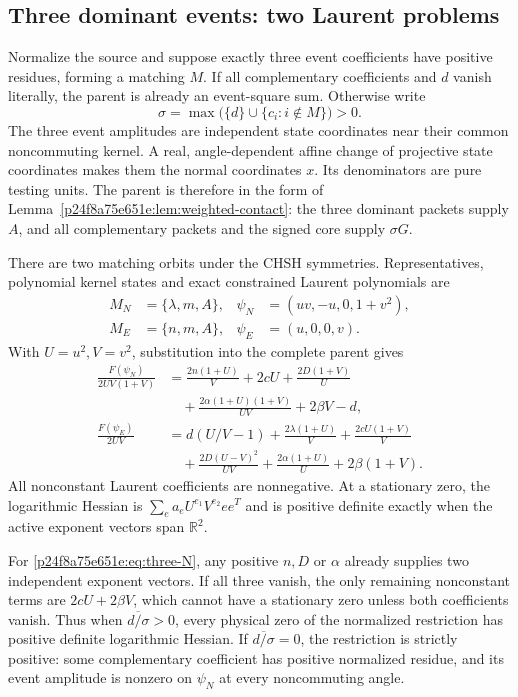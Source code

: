 \subsection{Three dominant events: two Laurent problems}
Normalize the source and suppose exactly three event coefficients have positive residues, forming a matching $M$. If all complementary coefficients and $d$ vanish literally, the parent is already an event-square sum. Otherwise write
\[
\sigma=\max\bigl(\{d\}\cup\{c_i:i\notin M\}\bigr)>0.
\]
The three event amplitudes are independent state coordinates near their common noncommuting kernel. A real, angle-dependent affine change of projective state coordinates makes them the normal coordinates $x$. Its denominators are pure testing units. The parent is therefore in the form of Lemma~\ref{p24f8a75e651e:lem:weighted-contact}: the three dominant packets supply $A$, and all complementary packets and the signed core supply $\sigma G$.

There are two matching orbits under the CHSH symmetries. Representatives, polynomial kernel states and exact constrained Laurent polynomials are
\begin{align*}
M_N&=\{\lambda,m,A\}, &\psi_N&=(uv,-u,0,1+v^2),\\
M_E&=\{n,m,A\}, &\psi_E&=(u,0,0,v).
\end{align*}
With $U=u^2,V=v^2$, substitution into the complete parent gives
\begin{align}
\frac{F(\psi_N)}{2UV(1+V)}
&=\frac{2n(1+U)}V+2cU+\frac{2D(1+V)}U\nonumber\\
&\quad +\frac{2\alpha(1+U)(1+V)}{UV}+2\beta V-d,
\label{p24f8a75e651e:eq:three-N}\\
\frac{F(\psi_E)}{2UV}
&=d(U/V-1)+\frac{2\lambda(1+U)}V+\frac{2cU(1+V)}V\nonumber\\
&\quad +\frac{2D(U-V)^2}{UV}+\frac{2\alpha(1+U)}U+2\beta(1+V).
\label{p24f8a75e651e:eq:three-E}
\end{align}
All nonconstant Laurent coefficients are nonnegative. At a stationary zero, the logarithmic Hessian is
$\sum_e a_e U^{e_1}V^{e_2}ee^T$ and is positive definite exactly when the active exponent vectors span $\mathbb R^2$.

For \eqref{p24f8a75e651e:eq:three-N}, any positive $n,D$ or $\alpha$ already supplies two independent exponent vectors. If all three vanish, the only remaining nonconstant terms are $2cU+2\beta V$, which cannot have a stationary zero unless both coefficients vanish. Thus when $\overline{d/\sigma}>0$, every physical zero of the normalized restriction has positive definite logarithmic Hessian. If $\overline{d/\sigma}=0$, the restriction is strictly positive: some complementary coefficient has positive normalized residue, and its event amplitude is nonzero on $\psi_N$ at every noncommuting angle.

